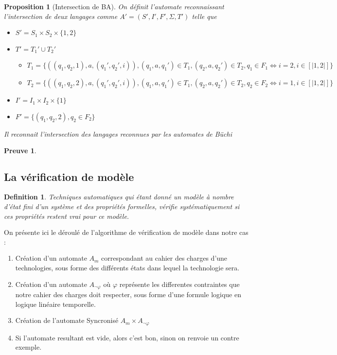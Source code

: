 \documentclass{paper}
\newtheorem{proposition}{Proposition}
\newtheorem{definition}{Definition}
\newtheorem{preuve}{Preuve}
\begin{document}
\begin{proposition}[Intersection de BA]
    On définit l'automate reconnaissant l'intersection de deux langages comme $A'= (S', I', F', \Sigma, T')$ telle que
    \begin{itemize}
        \item $S'=S_1\times S_2\times \{1,2\}$
        \item $T'=T_1'\cup T_2'$
        \begin{itemize}
            \item $T_1=\{((q_1,q_2,1),a,(q_1',q_2',i)), (q_1,a,q_1')\in T_1, (q_2,a,q_2')\in T_2, q_1\in F_1 \Leftrightarrow i= 2, i\in[|1,2|]\}$
            \item $T_2=\{((q_1,q_2,2),a,(q_1',q_2',i)), (q_1,a,q_1')\in T_1, (q_2,a,q_2')\in T_2,  q_2\in F_2 \Leftrightarrow i= 1, i\in[|1,2|]\}$
        \end{itemize}
        \item $I'= I_1\times I_2 \times \{1\}$
        \item $F'= \{(q_1,q_2,2), q_2\in F_2 \}$
    \end{itemize}
    Il reconnait l'intersection des langages reconnues par les automates de Büchi
\end{proposition}
\begin{preuve}
    
\end{preuve}

\subsection{La vérification de modèle}
    \begin{definition}
        Techniques automatiques qui étant donné un modèle à nombre d'état fini d'un système et des propriétés formelles, vérifie systématiquement si ces propriétés restent vrai pour ce modèle.
    \end{definition}

    On présente ici le déroulé de l'algorithme de vérification de modèle dans notre cas :
    \begin{enumerate}
        \item Création d'un automate $A_m$ correspondant au cahier des charges d'une technologies, sous forme des différents états dans lequel la technologie sera.
        \item Création d'un automate $A_{\lnot\varphi}$ où $\varphi$ représente les differentes contraintes que notre cahier des charges doit respecter, sous forme
        d'une formule logique en logique linéaire temporelle. 
        \item Création de l'automate Syncronisé $A_m\times A_{\lnot\varphi}$
        \item Si l'automate resultant est vide, alors c'est bon, sinon on renvoie un contre exemple.
    \end{enumerate}
\end{document}
